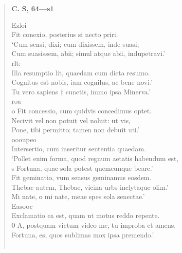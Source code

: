 \documentclass[11pt, a4paper]{report}
\begin{document}
\begin{verse}
     \marginpar{[13]} \begin{center} \textbf{C. S, 64—s1} \end{center}Ezloi \\ Fit conexio, posterius si necto priri. \\ ‘Cum sensi, dixi; cum dixissem, inde suasi; \\ Cum suasissem, abii; simul atque abii, indupetravi.’ \\ rlt: \\ Illa resumptio lit, quaedam cum dicta resumo. \\ Cognitus est nobis, iam cognilus, ac bene novi.’ \\ Tu vero sapiens † cunctis, immo ipsa Minerva.’ \\ roa \\ o Fit concessio, cum quidvis concedimus optet. \\ Necivit vel non potuit vel noluit: ut vis, \\ Pone, tibi permitto; tamen non debuit uti.’ \\ oooupeo \\ Intersertio, cum inseritur sententia quaedam. \\ ‘Pollet enim forma, quod regnum aetatis habendum est, \\ s Fortuna, quae sola potest quemcunque beare.’ \\ Fit geminatio, vum sensus geminamus eosdem. \\ Thebae autem, Thebae, vicina urbs inclytaque olim.’ \\ Mi nate, o mi nate, meae spes sola senectae.’ \\ Easooc \\ Exclamatio ea est, quam ut motus reddo repente. \\ 0 A, postquam victum video me, tu improba et amens, \\ Fortuna, es, quos sublimas mox ipsa premendo.’ \\ 
        ﻿\pagebreak 

\end{verse}
\end{document}
